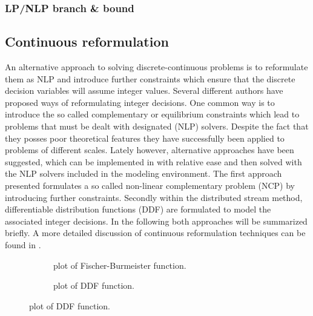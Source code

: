         \subsubsection{LP/NLP branch \& bound}



    \subsection{Continuous reformulation}
    \label{sec:opt:theory:continuous}
    An alternative approach to solving discrete-continuous problems is to reformulate them as NLP
    and introduce further constraints which ensure that the discrete decision variables will assume integer values.
    Several different authors have proposed ways of reformulating integer decisions. One common way is to introduce
    the so called complementary or equilibrium constraints which lead to problems that must be dealt with designated
    (NLP) solvers. Despite the fact that they posses poor theoretical features they have successfully been applied
    to problems of different scales. Lately however, alternative approaches have been suggested, which can be implemented
    in \gproms with relative ease and then solved with the NLP solvers included in the modeling environment.
    The first approach presented formulates a so called non-linear complementary problem (NCP) by introducing
    further constraints. Secondly within the distributed stream method, differentiable distribution functions (DDF)
    are formulated to model the associated integer decisions. In the following both approaches will be summarized briefly.
    A more detailed discussion of continuous reformulation techniques can be found in \cite{Stein.2004}.
    \begin{figure}
        \scriptsize
        \center
        \begin{subfigure}{0.48\textwidth}
            
            \caption{plot of Fischer-Burmeister function.}
            \label{fig:FB_plot}
        \end{subfigure}
            \begin{subfigure}{0.48\textwidth}
            
            \caption{plot of DDF function.}
            \label{fig:DDF_plot}
        \end{subfigure}
    \end{figure}

